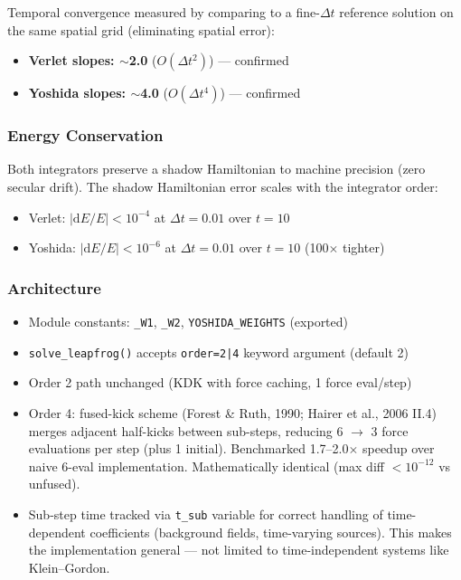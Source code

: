 Temporal convergence measured by comparing to a fine-$\Delta t$ reference solution
on the same spatial grid (eliminating spatial error):

\begin{itemize}
  \item \textbf{Verlet slopes: $\sim$2.0} ($O(\Delta t^2)$) --- confirmed
  \item \textbf{Yoshida slopes: $\sim$4.0} ($O(\Delta t^4)$) --- confirmed
\end{itemize}

\subsubsection{Energy Conservation}
\label{sec:yoshida-energy}

Both integrators preserve a shadow Hamiltonian to machine precision (zero
secular drift). The shadow Hamiltonian error scales with the integrator order:

\begin{itemize}
  \item Verlet: $|\mathrm{d}E/E| < 10^{-4}$ at $\Delta t=0.01$ over $t=10$
  \item Yoshida: $|\mathrm{d}E/E| < 10^{-6}$ at $\Delta t=0.01$ over $t=10$ (100$\times$ tighter)
\end{itemize}

\subsubsection{Architecture}
\label{sec:yoshida-architecture}

\begin{itemize}
  \item Module constants: \texttt{\_W1}, \texttt{\_W2}, \texttt{YOSHIDA\_WEIGHTS} (exported)
  \item \texttt{solve\_leapfrog()} accepts \texttt{order=2|4} keyword argument (default 2)
  \item Order 2 path unchanged (KDK with force caching, 1 force eval/step)
  \item Order 4: fused-kick scheme (Forest \& Ruth, 1990; Hairer et al., 2006
    II.4) merges adjacent half-kicks between sub-steps, reducing 6 $\to$ 3
    force evaluations per step (plus 1 initial). Benchmarked 1.7--2.0$\times$
    speedup over naive 6-eval implementation. Mathematically identical
    (max diff $< 10^{-12}$ vs unfused).
  \item Sub-step time tracked via \texttt{t\_sub} variable for correct handling of
    time-dependent coefficients (background fields, time-varying sources).
    This makes the implementation general --- not limited to time-independent
    systems like Klein--Gordon.
\end{itemize}

